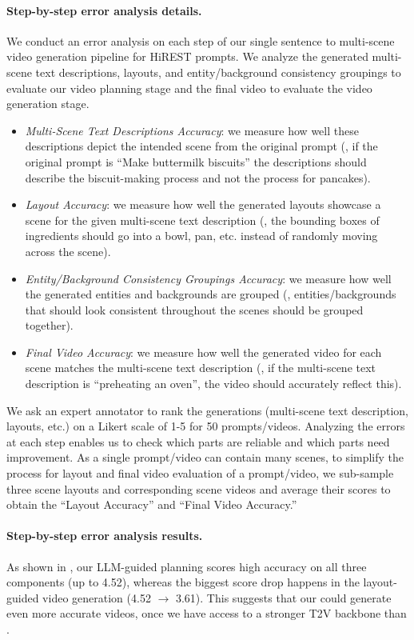 \paragraph{Step-by-step error analysis details.}
We conduct an error analysis on each step of our single sentence to multi-scene video generation pipeline for HiREST prompts. We analyze the generated multi-scene text descriptions,
layouts, and entity/background consistency groupings to evaluate our video planning stage and the final video to evaluate the video generation stage.
\begin{itemize}
    \item \textit{Multi-Scene Text Descriptions Accuracy}: we measure how well these descriptions depict the intended scene from the original prompt (\eg{}, if the original prompt is ``Make buttermilk biscuits'' the descriptions should describe the biscuit-making process and not the process for pancakes).
    \item \textit{Layout Accuracy}: we measure how well the generated layouts showcase a scene for the given multi-scene text description (\eg{}, the bounding boxes of ingredients should go into a bowl, pan, etc. instead of randomly moving across the scene).
    \item \textit{Entity/Background Consistency Groupings Accuracy}: we measure how well the generated entities and backgrounds are grouped (\eg{}, entities/backgrounds that should look consistent throughout the scenes should be grouped together).
    \item \textit{Final Video Accuracy}: we measure how well the generated video for each scene matches the multi-scene text description (\eg{}, if the multi-scene text description is ``preheating an oven'', the video should accurately reflect this).
\end{itemize}
We ask an expert annotator to rank the generations (multi-scene text description, layouts, etc.) on a Likert scale of 1-5 for 50 prompts/videos. Analyzing the errors at each step enables us to check which parts are reliable and which parts need improvement. As a single prompt/video can contain many scenes, to simplify the process for layout and final video evaluation of a prompt/video, we sub-sample three scene layouts and corresponding scene videos and average their scores to obtain the ``Layout Accuracy'' and ``Final Video Accuracy.''

\paragraph{Step-by-step error analysis results.}
As shown in , our LLM-guided planning scores high accuracy on all three components (up to 4.52), whereas the biggest score drop happens in the layout-guided video generation (4.52 $\rightarrow$ 3.61).
This suggests that our \method{} could generate even more accurate videos,
once we have access to a stronger T2V backbone than \modelscope{}.


